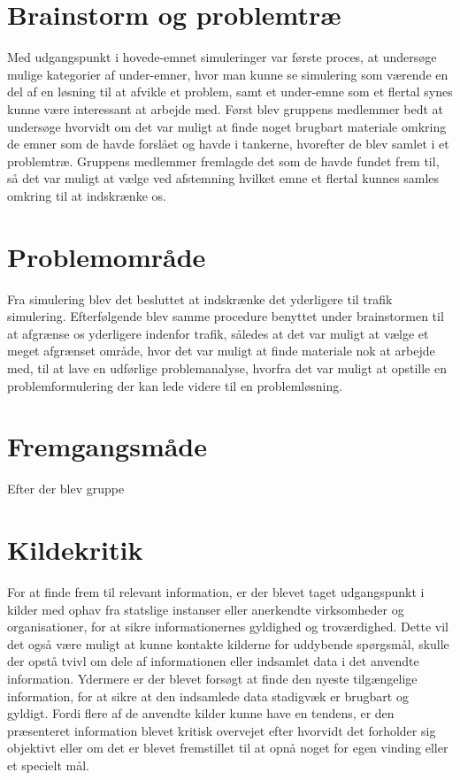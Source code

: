 \section{Brainstorm og problemtræ}

Med udgangspunkt i hovede-emnet simuleringer var første proces, at undersøge mulige kategorier af under-emner, hvor man kunne se simulering som værende en del af en løsning til at afvikle et problem, samt et under-emne som et flertal synes kunne være interessant at arbejde med. Først blev gruppens medlemmer bedt at undersøge hvorvidt om det var muligt at finde noget brugbart materiale omkring de emner som de havde forslået og havde i tankerne, hvorefter de blev samlet i et problemtræ. Gruppens medlemmer fremlagde det som de havde fundet frem til, så det var muligt at vælge ved afstemning hvilket emne et flertal kunnes samles omkring til at indskrænke os.

\section{Problemområde}

Fra simulering blev det besluttet at indskrænke det yderligere til trafik simulering. Efterfølgende blev samme procedure benyttet under brainstormen til at afgrænse os yderligere indenfor trafik, således at det var muligt at vælge et meget afgrænset område, hvor det var muligt at finde materiale nok at arbejde med, til at lave en udførlige problemanalyse, hvorfra det var muligt at opstille en problemformulering der kan lede videre til en problemløsning. 

\section{Fremgangsmåde}

Efter der blev gruppe

\section{Kildekritik}
For at finde frem til relevant information, er der blevet taget udgangspunkt i kilder med ophav fra statslige instanser eller anerkendte virksomheder og organisationer, for at sikre informationernes gyldighed og troværdighed. Dette vil det også være muligt at kunne kontakte kilderne for uddybende spørgsmål, skulle der opstå tvivl om dele af informationen eller indsamlet data i det anvendte information. Ydermere er der blevet forsøgt at finde den nyeste tilgængelige information, for at sikre at den indsamlede data stadigvæk er brugbart og gyldigt. Fordi flere af de anvendte kilder kunne have en tendens, er den præsenteret information blevet kritisk overvejet efter hvorvidt det forholder sig objektivt eller om det er blevet fremstillet til at opnå noget for egen vinding eller et specielt mål.

